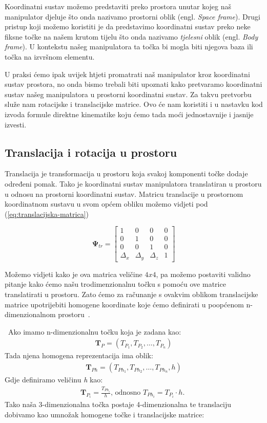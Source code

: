 \documentclass[times, utf8, diplomskirad]{fer}
\begin{document}
Koordinatni sustav možemo predstaviti preko prostora unutar kojeg naš manipulator djeluje što onda nazivamo prostorni oblik (engl. \textit{Space frame}).
Drugi pristup koji možemo koristiti je da predstavimo koordinatni sustav preko neke fiksne točke na našem krutom tijelu što onda nazivamo \textit{tjelesni} oblik (engl. \textit{Body frame}).
U kontekstu našeg manipulatora ta točka bi mogla biti njegova baza ili točka na izvršnom elementu.

U praksi ćemo ipak uvijek htjeti promatrati naš manipulator kroz koordinatni sustav prostora, no onda bismo trebali biti upoznati kako pretvaramo koordinatni sustav našeg manipulatora u prostorni koordinatni sustav.
Za takvu pretvorbu služe nam rotacijske i translacijske matrice.
Ovo će nam koristiti i u nastavku kod izvoda formule direktne kinematike koju ćemo tada moći jednostavnije i jasnije izvesti.

\subsection{Translacija i rotacija u prostoru}
Translacija je transformacija u prostoru koja svakoj komponenti točke dodaje određeni pomak.
Tako je koordinatni sustav manipulatora translatiran u prostoru u odnosu na prostorni koordinatni sustav.
Matricu translacije u prostornom koordinatnom sustavu u svom općem obliku možemo vidjeti pod (\ref{eq:translacijska-matrica})

\begin{equation}
\boldsymbol{\Psi}_{t r}=\left[
    \begin{array}{cccc}
        1 & 0 & 0 & 0 \\
        0 & 1 & 0 & 0 \\
        0 & 0 & 1 & 0 \\
        \Delta_x & \Delta_y & \Delta_z & 1
    \end{array}
    \right]
    \label{eq:translacijska-matrica}
\end{equation}

Možemo vidjeti kako je ova matrica veličine $4 x 4$, pa možemo postaviti validno pitanje kako ćemo našu trodimenzionalnu točku s pomoću ove matrice translatirati u prostoru.
Zato ćemo za računanje s ovakvim oblikom translacijske matrice upotrijebiti homogene koordinate koje ćemo definirati u poopćenom n-dimenzionalnom prostoru~\cite{book:irg}.

\noindent~Ako imamo n-dimenzionalnu točku koja je zadana kao:
\begin{align*}
    \bm T_P=\left(T_{P_1}, T_{P_2}, \ldots, T_{P_n}\right)
\end{align*}
Tada njena homogena reprezentacija ima oblik:
\begin{align*}
    \bm T_{Ph}=\left(T_{Ph_1}, T_{Ph_2}, \ldots, T_{Ph_n}, h\right)
\end{align*}
Gdje definiramo veličinu \textit{h} kao:
\begin{align*}
    \bm T_{P_i}=\frac{T_{P h_i}}{h} \text {, odnosno } T_{P h_i}=T_{P_i} \cdot h \text {. }
\end{align*}
Tako naša 3-dimenzionalna točka postaje 4-dimenzionalna te translaciju dobivamo kao umnožak homogene točke i translacijske matrice:
\end{document}
